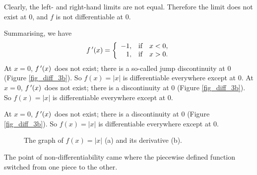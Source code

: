 \begin{example}
\begin{enumerate}
Clearly, the left- and right-hand limits are not equal. Therefore the limit does not exist at 0, and $f$ is not differentiable at 0.
\end{enumerate}
Summarising, we have $$f\,'(x) = \left\{\begin{array}{rcl} -1, & \mbox{if} & x<0, \\ 1, & \mbox{if} & x>0. \end{array}\right.$$ 
\ifcourse
\ifanalysis At $x=0$, $f\,'(x)$ does not exist; there is a so-called jump discontinuity at 0 (Figure \ref{fig_diff_3b}). So $f(x) = |x|$ is differentiable everywhere except at 0. 
\fi
\ifcalculus At $x=0$, $f\,'(x)$ does not exist; there is a  discontinuity at 0 (Figure \ref{fig_diff_3b}). So $f(x) = |x|$ is differentiable everywhere except at 0. 
\fi
\fi

\ifvc At $x=0$, $f\,'(x)$ does not exist; there is a  discontinuity at 0 (Figure \ref{fig_diff_3b}). So $f(x) = |x|$ is differentiable everywhere except at 0. 
\fi

\begin{figure}[H]
\centering
\qquad
{}
\caption{The graph of $f(x)=\left|x\right|$ (a) and its derivative (b). }
\end{figure}


\end{example}

The point of non-differentiability came where the piecewise defined function switched from one piece to the other.



